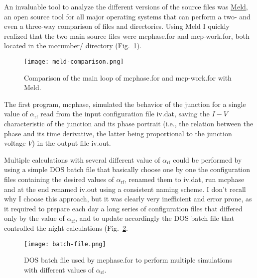 An invaluable tool to analyze the different versions of the source files was \href{http://meldmerge.org/}{Meld}, an open source tool for all major operating systems that can perform a two- and even a three-way comparison of files and directories.
Using Meld I quickly realized that the two main source files were \textsf{mcphase.for} and \textsf{mcp-work.for}, both located in the \textsf{mccumber/} directory  (Fig.~\ref{fig:meld-comparison}).

\begin{figure}[bt]
	\centering
	\texttt{[image: meld-comparison.png]}
	\caption{Comparison of the main loop of \textsf{mcphase.for} and \textsf{mcp-work.for} with Meld.}
	\label{fig:meld-comparison}
\end{figure}


The first program, \textsf{mcphase}, simulated the behavior of the junction for a single value of $\alpha_\mathrm{rf}$ read from the input configuration file \textsf{iv.dat}, saving the $I - V$ characteristic of the junction and its phase portrait (i.e., the relation between the phase and its time derivative, the latter being proportional to the junction voltage $V$) in the output file \textsf{iv.out}.

Multiple calculations with several different value of $\alpha_\mathrm{rf}$ could be performed by using a simple DOS batch file that basically choose one by one the configuration files containing the desired values of $\alpha_\mathrm{rf}$, renamed them to \textsf{iv.dat}, run \textsf{mcphase} and at the end renamed \textsf{iv.out} using a consistent naming scheme.
I don't recall why I choose this approach, but it was clearly very inefficient and error prone, as it required to prepare each day a long series of configuration files that differed only by the value of $\alpha_\mathrm{rf}$, and to update accordingly the DOS batch file that controlled the night calculations (Fig.~\ref{fig:batch-file}.

\begin{figure}[tbh]
	\centering
	\texttt{[image: batch-file.png]}
	\caption{DOS batch file used by \textsf{mcphase.for} to perform multiple simulations with different values of $\alpha_\mathrm{rf}$.}
	\label{fig:batch-file}
\end{figure}


